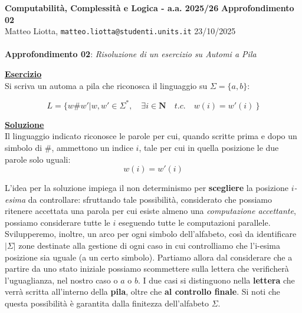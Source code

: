 \documentclass[a4paper,10pt]{article}
\newcommand{\EsercitazioneNum}{02}
\newcommand{\Data}{23/10/2025}
\begin{document}
\footnotesize 

\noindent
\small \textbf{Computabilità, Complessità e Logica - a.a. 2025/26} \hfill \textbf{Approfondimento \EsercitazioneNum} \\[0.2cm]
\scriptsize Matteo Liotta, \texttt{matteo.liotta@studenti.units.it} \hfill \Data \\[0.2cm]

\noindent\makebox[\linewidth]{\rule{\linewidth}{0.4pt}} \\[1cm]


\noindent\Large \textbf{Approfondimento \EsercitazioneNum}: \textit{Risoluzione di un esercizio su Automi a Pila}\\[0cm]

\small

\noindent\underline{\textbf{Esercizio}}\\[0.3cm]
Si scriva un automa a pila che riconosca il linguaggio su $\Sigma=\{a,b\}$:

$$L=\{w\#w'| w,w'\in\Sigma^*, \quad \exists i \in \mathbf{N} \quad t.c.\quad  w(i)=w'(i)\ \}$$


\noindent\underline{\textbf{Soluzione}}\\[0.3cm]
\noindent Il linguaggio indicato riconosce le parole per cui, quando scritte prima e dopo un simbolo di $\#$, ammettono un indice $i$, tale per cui in quella posizione le due parole solo uguali:
$$w(i)=w'(i)$$

\noindent L'idea per la soluzione impiega il non determinismo per \textbf{scegliere} la posizione \textit{$i$-esima} da controllare: sfruttando tale possibilità, considerato che possiamo ritenere accettata una parola per cui esiste almeno una \textit{computazione accettante}, possiamo considerare tutte le $i$ eseguendo tutte le computazioni parallele.\\

\noindent Svilupperemo, inoltre, un arco per ogni simbolo dell'alfabeto, così da identificare $|\Sigma|$ zone destinate alla gestione di ogni caso in cui controlliamo che l'i-esima posizione sia uguale (a un certo simbolo). 
Partiamo allora dal considerare che a partire da uno stato iniziale possiamo scommettere sulla lettera che verificherà l'uguaglianza, nel nostro caso o $a$ o $b$. I due casi si distinguono nella \textbf{lettera} che verrà scritta all'interno della \textbf{pila}, oltre che \textbf{al controllo finale}. Si noti che questa possibilità è garantita dalla finitezza dell'alfabeto $\Sigma$. 
\end{document}
